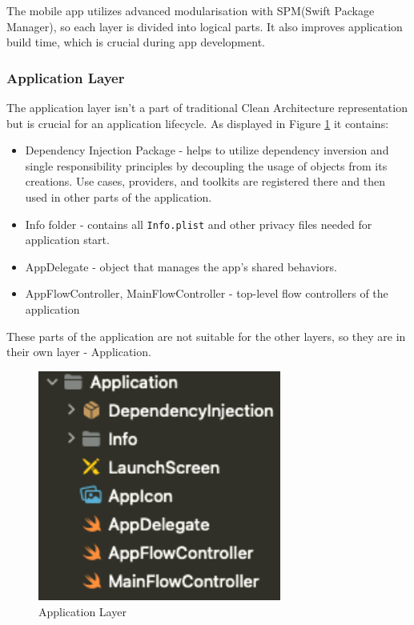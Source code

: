 \documentclass[
  biblatex,
  language=english,
  figures=false,
  sourcecodes,
  glossaries,
  index
]{kidiplom}
\begin{document}
The mobile app utilizes advanced modularisation with SPM(Swift Package Manager), so each layer is divided into logical parts. It also improves application build time, which is crucial during app development.

\subsubsection{Application Layer}
The application layer isn't a part of traditional Clean Architecture representation but is crucial for an application lifecycle. As displayed in Figure \ref{fig:image5} it contains:
\begin{itemize}
	\item Dependency Injection Package - helps to utilize dependency inversion and single responsibility principles by decoupling the usage of objects from its creations. Use cases, providers, and toolkits are registered there and then used in other parts of the application.
	\item Info folder - contains all \texttt{Info.plist} and other privacy files needed for application start.
	\item AppDelegate - object that manages the app's shared behaviors.
	\item AppFlowController, MainFlowController - top-level flow controllers of the application
\end{itemize}

These parts of the application are not suitable for the other layers, so they are in their own layer - Application.

\begin{figure}[h]
\centering
\includegraphics[width=8cm]{image5}
\caption{Application Layer}
\label{fig:image5}
\end{figure}
\end{document}
